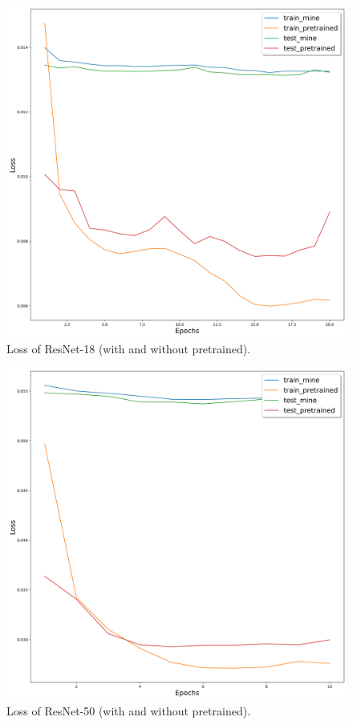 	\begin{figure}[H]
		\centering
		\includegraphics[scale=0.3]{img/resnet18_loss.png}
		\caption{Loss of ResNet-18 (with and without pretrained).}
		\label{resnet18-loss}
	\end{figure}
	\begin{figure}[H]
		\centering
		\includegraphics[scale=0.3]{img/resnet50_loss.png}
		\caption{Loss of ResNet-50 (with and without pretrained).}
		\label{resnet50-loss}
	\end{figure}

